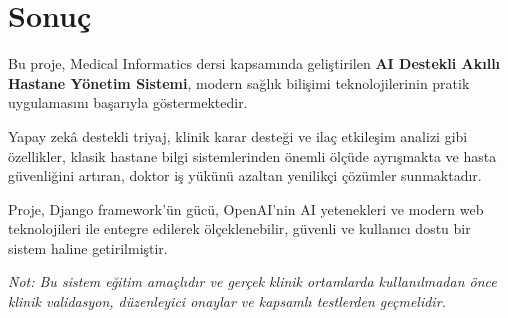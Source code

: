 \documentclass[12pt,a4paper]{article}
\begin{document}
\section{Sonuç}

Bu proje, Medical Informatics dersi kapsamında geliştirilen \textbf{AI Destekli Akıllı Hastane Yönetim Sistemi}, modern sağlık bilişimi teknolojilerinin pratik uygulamasını başarıyla göstermektedir. 

Yapay zekâ destekli triyaj, klinik karar desteği ve ilaç etkileşim analizi gibi özellikler, klasik hastane bilgi sistemlerinden önemli ölçüde ayrışmakta ve hasta güvenliğini artıran, doktor iş yükünü azaltan yenilikçi çözümler sunmaktadır.

Proje, Django framework'ün gücü, OpenAI'nin AI yetenekleri ve modern web teknolojileri ile entegre edilerek ölçeklenebilir, güvenli ve kullanıcı dostu bir sistem haline getirilmiştir.

\vspace{1cm}

\textit{Not: Bu sistem eğitim amaçlıdır ve gerçek klinik ortamlarda kullanılmadan önce klinik validasyon, düzenleyici onaylar ve kapsamlı testlerden geçmelidir.}
\end{document}
